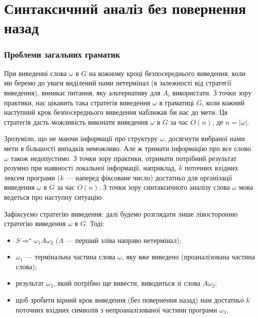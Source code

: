 \setcounter{section}{8}

\section{Синтаксичний аналіз без повернення назад}

\subsubsection{Проблеми загальних граматик}

При виведенні слова $\omega$ в $G$ на кожному кроці безпосереднього виведення, коли ми беремо до уваги виділений нами нетермінал (в залежності від стратегії виведення), виникає питання, яку альтернативу для $A_i$ використати. З точки зору практики, нас цікавить така стратегія виведення $\omega$ в граматиці $G$, коли кожний наступний крок безпосереднього виведення наближав би нас до мети. Ця стратегія дасть можливість виконати виведення $\omega$ в $G$ за час $O(n)$, де $n = |\omega|$. \medskip

Зрозуміло, що не маючи інформації про структуру $\omega$, досягнути вибраної нами мети в більшості випадків неможливо. Але ж тримати інформацію про все слово $\omega$ також недопустимо. З точки зору практики, отримати потрібний результат розумно при наявності локальної інформації, наприклад, $k$ поточних вхідних лексем програми ($k$ --- наперед фіксоване число) достатньо для організації виведення $\omega$ в $G$ за час $O(n)$. З точки зору синтаксичного аналізу слова $\omega$ мова ведеться про наступну ситуацію:
\begin{figure}[H]
	\centering
	
\end{figure}

Зафіксуємо стратегію виведення: далі будемо розглядати лише лівосторонню стратегію виведення $\omega$ в $G$. Тоді:
\begin{itemize}
	\item $S \Rightarrow^\star \omega_1 A \omega_2$ ($A$ --- перший зліва направо нетермінал);
	\item $\omega_1$ --- термінальна частина слова $\omega$, яку вже виведено (проаналізована частина слова);
	\item результат $\omega_3$, який потрібно ще вивести, виводиться зі слова $A \omega_2$;
	\item щоб зробити вірний крок виведення (без повернення назад) нам достатньо $k$ поточних  вхідних символів з непроаналізованої частини програми $\omega_3$.
\end{itemize}

